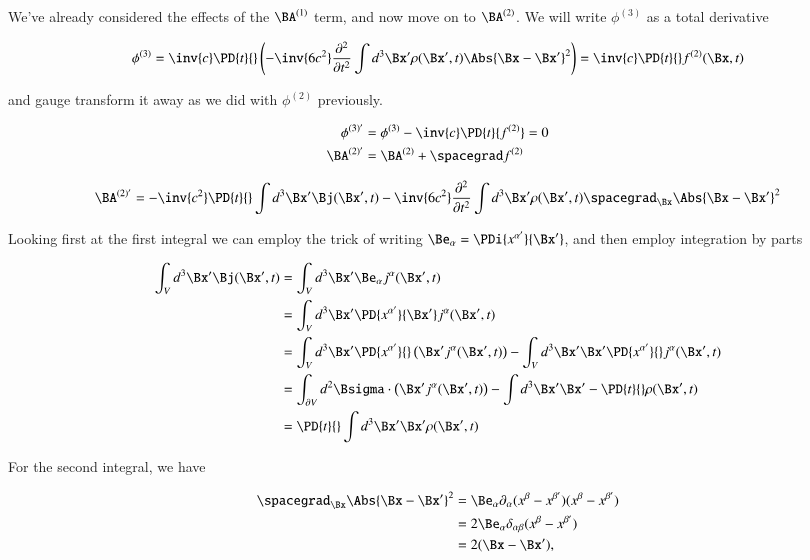 We've already considered the effects of the $\BA^{(1)}$ term, and now move on to $\BA^{(2)}$.  We will write $\phi^{(3)}$ as a total derivative

\begin{equation}\label{eqn:relativisticElectrodynamicsL27:50}
\phi^{(3)} = \inv{c} \PD{t}{} \left( 
- \inv{6 c^2} 
\frac{\partial^2}{\partial t^2} \int d^3 \Bx' \rho(\Bx', t)
\Abs{\Bx - \Bx'}^2
\right)
= \inv{c} \PD{t}{} f^{(2)}(\Bx, t)
\end{equation}

and gauge transform it away as we did with $\phi^{(2)}$ previously.

\begin{align}\label{eqn:relativisticElectrodynamicsL27:70}
\phi^{(3)'} &= \phi^{(3)} - \inv{c} \PD{t}{f^{(2)}} = 0 \\
\BA^{(2)'} &= \BA^{(2)} + \spacegrad f^{(2)} 
\end{align}

\begin{align*}
\BA^{(2)'} 
&= 
- 
\inv{c^2} \PD{t}{} \int d^3 \Bx' \Bj(\Bx', t) 
- \inv{6 c^2} 
\frac{\partial^2}{\partial t^2} \int d^3 \Bx' \rho(\Bx', t)
\spacegrad_{\Bx} \Abs{\Bx - \Bx'}^2 \\
\end{align*}

Looking first at the first integral we can employ the trick of writing $\Be_\alpha = \PDi{x^{\alpha'}}{\Bx'}$, and then employ integration by parts

\begin{align*}
\int_V d^3 \Bx' \Bj(\Bx', t) 
&=
\int_V d^3 \Bx' 
\Be_\alpha j^\alpha (\Bx', t)  \\
&=
\int_V d^3 \Bx' 
\PD{x^{\alpha'}}{\Bx'}
j^\alpha (\Bx', t)  \\
&=
\int_V d^3 \Bx' 
\PD{x^{\alpha'}}{} 
\left( \Bx' j^\alpha (\Bx', t) \right)
-\int_V d^3 \Bx'
\Bx' \PD{x^{\alpha'}}{} j^\alpha (\Bx', t) \\
&=
\int_{\partial V} d^2 \Bsigma \cdot 
\left( \Bx' j^\alpha (\Bx', t) \right)
-\int d^3 \Bx' 
\Bx' -\PD{t}{} \rho(\Bx', t) \\
&=
\PD{t}{} \int d^3 \Bx' 
\Bx' \rho(\Bx', t) \\
\end{align*}

For the second integral, we have

\begin{align*}
\spacegrad_{\Bx} \Abs{\Bx - \Bx'}^2 
&= 
\Be_\alpha \partial_\alpha 
(x^\beta - x^{\beta'})
(x^\beta - x^{\beta'}) \\
&=
2 \Be_\alpha \delta_{\alpha \beta}
(x^\beta - x^{\beta'}) \\
&= 2 (\Bx - \Bx'),
\end{align*}

